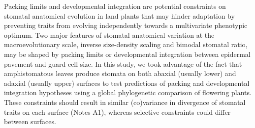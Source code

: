 \documentclass[
  12pt,
]{article}
\begin{document}
Packing limits and developmental integration are potential constraints on stomatal anatomical evolution in land plants that may hinder adaptation by preventing traits from evolving independently towards a multivariate phenotypic optimum. Two major features of stomatal anatomical variation at the macroevolutionary scale, inverse size-density scaling and bimodal stomatal ratio, may be shaped by packing limits or developmental integration between epidermal pavement and guard cell size. In this study, we took advantage of the fact that amphistomatous leaves produce stomata on both abaxial (usually lower) and adaxial (usually upper) surfaces to test predictions of packing and developmental integration hypotheses using a global phylogenetic comparison of flowering plants. These constraints should result in similar (co)variance in divergence of stomatal traits on each surface (Notes A1), whereas selective constraints could differ between surfaces.
\end{document}
